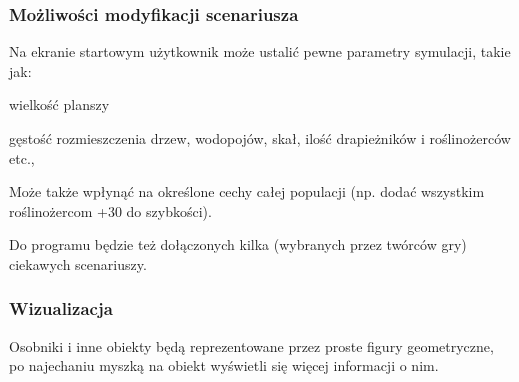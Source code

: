 \subsubsection*{Możliwości modyfikacji scenariusza}

Na ekranie startowym użytkownik może ustalić pewne parametry symulacji, takie jak\-:


\begin{DoxyItemize}
\item wielkość planszy
\end{DoxyItemize}


\begin{DoxyItemize}
\item gęstość rozmieszczenia drzew, wodopojów, skał, ilość drapieżników i roślinożerców etc.,
\end{DoxyItemize}

Może także wpłynąć na określone cechy całej populacji (np. dodać wszystkim roślinożercom +30 do szybkości).

Do programu będzie też dołączonych kilka (wybranych przez twórców gry) ciekawych scenariuszy.

\subsubsection*{Wizualizacja}

Osobniki i inne obiekty będą reprezentowane przez proste figury geometryczne, po najechaniu myszką na obiekt wyświetli się więcej informacji o nim. 